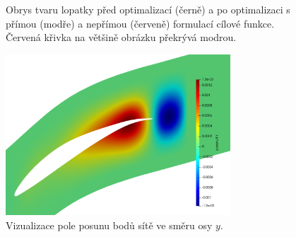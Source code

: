 \begin{figure}[H]
	\centering
	\def\svgwidth{0.8\textwidth}
	\graphicspath{{img/inkscape/}}
	
	\caption[Tvar optimalizované lopatky]{Obrys tvaru lopatky před optimalizací (černě) a po optimalizaci s přímou (modře) a nepřímou (červeně) formulací cílové funkce. Červená křivka na většině obrázku překrývá modrou.}
	\label{fig:ghs1_alphaminus4}
\end{figure}

\begin{figure}[H]
\includegraphics[width=0.75\textwidth]{img/displacement_12.png}
\caption[Pole posunutí sítě]{Vizualizace pole posunu bodů sítě ve směru osy $ y $.}
\label{fig:ghs1_disp12}
\end{figure}


